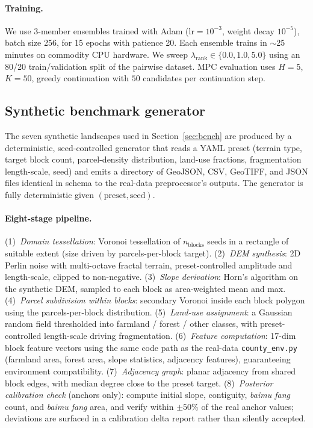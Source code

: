 \documentclass[11pt]{article}
\begin{document}
\paragraph{Training.} We use 3-member ensembles trained with Adam ($\text{lr}=10^{-3}$, weight decay $10^{-5}$), batch size 256, for 15 epochs with patience 20. Each ensemble trains in $\sim$25 minutes on commodity CPU hardware. We sweep $\lambda_{\text{rank}} \in \{0.0, 1.0, 5.0\}$ using an 80/20 train/validation split of the pairwise dataset. MPC evaluation uses $H{=}5$, $K{=}50$, greedy continuation with $50$ candidates per continuation step.

\subsection*{Synthetic benchmark generator}\label{sec:methods-synth}

The seven synthetic landscapes used in Section~\ref{sec:bench} are produced by a deterministic, seed-controlled generator that reads a YAML preset (terrain type, target block count, parcel-density distribution, land-use fractions, fragmentation length-scale, seed) and emits a directory of GeoJSON, CSV, GeoTIFF, and JSON files identical in schema to the real-data preprocessor's outputs. The generator is fully deterministic given $(\text{preset}, \text{seed})$.

\paragraph{Eight-stage pipeline.} (1)~\emph{Domain tessellation}: Voronoi tessellation of $n_{\text{blocks}}$ seeds in a rectangle of suitable extent (size driven by parcels-per-block target). (2)~\emph{DEM synthesis}: 2D Perlin noise with multi-octave fractal terrain, preset-controlled amplitude and length-scale, clipped to non-negative. (3)~\emph{Slope derivation}: Horn's algorithm on the synthetic DEM, sampled to each block as area-weighted mean and max. (4)~\emph{Parcel subdivision within blocks}: secondary Voronoi inside each block polygon using the parcels-per-block distribution. (5)~\emph{Land-use assignment}: a Gaussian random field thresholded into farmland / forest / other classes, with preset-controlled length-scale driving fragmentation. (6)~\emph{Feature computation}: 17-dim block feature vectors using the same code path as the real-data \texttt{county\_env.py} (farmland area, forest area, slope statistics, adjacency features), guaranteeing environment compatibility. (7)~\emph{Adjacency graph}: planar adjacency from shared block edges, with median degree close to the preset target. (8)~\emph{Posterior calibration check} (anchors only): compute initial slope, contiguity, \textit{baimu fang} count, and \textit{baimu fang} area, and verify within $\pm 50\%$ of the real anchor values; deviations are surfaced in a calibration delta report rather than silently accepted.
\end{document}
